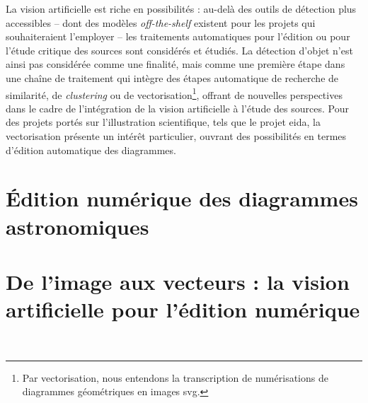 \documentclass[a4paper,12pt,twoside]{book}
\newcommand{\eida}{\gls{eida}\xspace}
\newcommand{\svg}{\gls{svg}\xspace}
\begin{document}
        La vision artificielle est riche en possibilités : au-delà des outils de détection plus accessibles -- dont des modèles \textit{off-the-shelf} existent pour les projets qui souhaiteraient l'employer -- les traitements automatiques pour l'édition ou pour l'étude critique des sources sont considérés et étudiés. La détection d'objet n'est ainsi pas considérée comme une finalité, mais comme une première étape dans une chaîne de traitement qui intègre des étapes automatique de recherche de similarité, de \textit{clustering} ou de vectorisation\footnote{Par vectorisation, nous entendons la transcription de numérisations de diagrammes géométriques en images \svg.}, offrant de nouvelles perspectives dans le cadre de l'intégration de la vision artificielle à l'étude des sources. Pour des projets portés sur l'illustration scientifique, tels que le projet \eida, la vectorisation présente un intérêt particulier, ouvrant des possibilités en termes d'édition automatique des diagrammes.
        
            \section{Édition numérique des diagrammes astronomiques}
                
        
            \section[De l’image aux vecteurs]{\label{vectorEdition}De l’image aux vecteurs : la vision artificielle pour l’édition numérique}
                
        	\\
        
\end{document}
